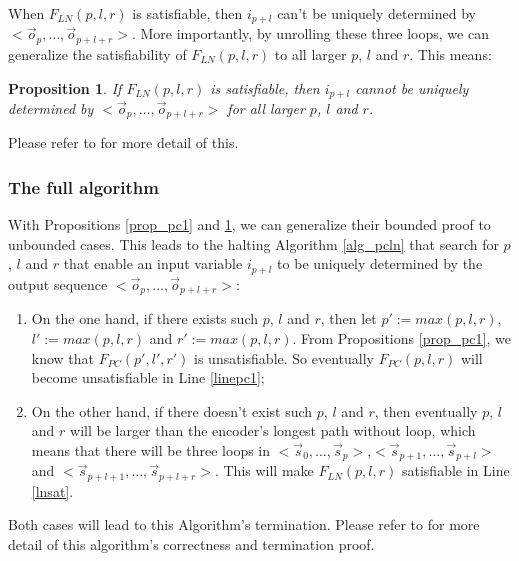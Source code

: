 \documentclass[twocolumn]{article}
\newtheorem{proposition}{Proposition}
\begin{document}


When $F_{LN}(p,l,r)$ is satisfiable,
then $i_{p+l}$ can't be uniquely determined by $<\vec{o}_{p},\dots,\vec{o}_{p+l+r}>$.
More importantly,
by unrolling these three loops,
we can generalize the satisfiability of $F_{LN}(p,l,r)$ to all larger $p$, $l$ and $r$.
This means:


\begin{proposition}\label{prop_ln1}
If $F_{LN}(p,l,r)$ is satisfiable,
then $i_{p+l}$ cannot be uniquely determined by $<\vec{o}_{p},\dots,\vec{o}_{p+l+r}>$ for all larger $p$, $l$ and $r$.
\end{proposition}

Please refer to \cite{ShenTCAD11} for more detail of this.

\subsubsection{The full algorithm}\label{subsub_algo}

With Propositions \ref{prop_pc1} and \ref{prop_ln1},
we can generalize their bounded proof to unbounded cases.
This leads to the halting
Algorithm \ref{alg_pcln} that search for $p$, $l$ and $r$ that enable
an input variable $i_{p+l}$ to be uniquely determined by the output sequence $<\vec{o}_{p},\dots,\vec{o}_{p+l+r}>$:
\begin{enumerate}
 \item 
On the one hand, 
if there exists such $p$, $l$ and $r$,
then let $p':=max(p,l,r)$, $l':=max(p,l,r)$ and $r':=max(p,l,r)$.
From Propositions \ref{prop_pc1},
we know that $F_{PC}(p',l',r')$ is unsatisfiable.
So eventually $F_{PC}(p,l,r)$ will become unsatisfiable in Line \ref{linepc1};
 \item
On the other hand,
if there doesn't exist such $p$, $l$ and $r$,
then eventually $p$, $l$ and $r$ will be larger than the encoder's longest path without loop,
which means that there will be three loops in $<\vec{s}_{0},\dots,\vec{s}_{p}>$,$<\vec{s}_{p+1},\dots,\vec{s}_{p+l}>$ and 
$<\vec{s}_{p+l+1},\dots,\vec{s}_{p+l+r}>$.
This will make $F_{LN}(p,l,r)$ satisfiable in Line \ref{lnsat}.
\end{enumerate}

Both cases will lead to this Algorithm's termination.
Please refer to \cite{ShenTCAD11} for more detail of this algorithm's correctness and termination proof.
\end{document}
